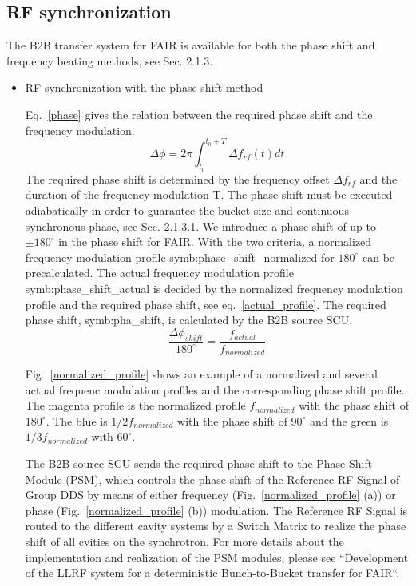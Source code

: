 \subsection{RF synchronization}
The B2B transfer system for FAIR is available for both the phase shift and frequency beating methods, see Sec. 2.1.3.
\begin{itemize}
\item RF synchronization with the phase shift method

Eq.~\ref{phase} gives the relation between the required phase shift and the frequency modulation. 
\begin{equation}
\Delta \phi= 2\pi \int_{t_0}^{t_0+T} \Delta f_{rf}(t)dt \label{phase}
\end{equation}
The required phase shift is determined by the frequency offset $\Delta f_{rf}$ and the duration of the frequency modulation T. The phase shift must be executed adiabatically in order to guarantee the bucket size and continuous synchronous phase, see Sec. 2.1.3.1. We introduce a phase shift of up to $\pm 180^\circ$ in the phase shift for FAIR. With the two criteria, a normalized frequency modulation profile \gls{symb:phase_shift_normalized} for $180^\circ$ can be precalculated. The actual frequency modulation profile \gls{symb:phase_shift_actual} is decided by the normalized frequency modulation profile and the required phase shift, see eq.~\ref{actual_profile}. The required phase shift, \gls{symb:pha_shift}, is calculated by the B2B source SCU.
\begin{equation}
\frac{\Delta \phi_{shift}}{180^\circ}= \frac{f_{actual}}{f_{normalized}} \label{actual_profile}
\end{equation}

Fig.~\ref{normalized_profile} shows an example of a normalized and several actual frequenc modulation profiles and the corresponding phase shift profile. The magenta profile is the normalized profile $f_{normalized}$ with the phase shift of $180^\circ$. The blue is $1/2f_{normalized}$ with the phase shift of $90^\circ$ and the green is $1/3f_{normalized}$ with $60^\circ$. 

The B2B source SCU sends the required phase shift to the Phase Shift Module (\gls{PSM}), which controls the phase shift of the Reference RF Signal of Group DDS by means of either frequency (Fig.~\ref{normalized_profile} (a)) or phase (Fig.~\ref{normalized_profile} (b)) modulation. The Reference RF Signal is routed to the different cavity systems by a Switch Matrix to realize the phase shift of all cvities on the synchrotron. For more details about the implementation and realization of the PSM modules, please see ``Development of the LLRF system for a deterministic Bunch-to-Bucket transfer for FAIR``.
                       

\end{itemize}
